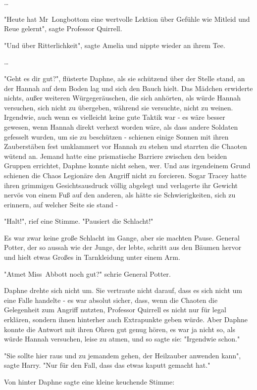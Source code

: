 {…

"Heute hat Mr~Longbottom eine wertvolle Lektion über Gefühle wie Mitleid und Reue gelernt", sagte Professor Quirrell.

"Und über Ritterlichkeit", sagte Amelia und nippte wieder an ihrem Tee.

…

"Geht es dir gut?", flüsterte Daphne, als sie schützend über der Stelle stand, an der Hannah auf dem Boden lag und sich den Bauch hielt. Das Mädchen erwiderte nichts, außer weiteren Würgegeräuschen, die sich anhörten, als würde Hannah versuchen, sich nicht zu übergeben, während sie versuchte, nicht zu weinen. Irgendwie, auch wenn es vielleicht keine gute Taktik war - es wäre besser gewesen, wenn Hannah direkt verhext worden wäre, als dass andere Soldaten gefesselt wurden, um sie zu beschützen - schienen einige Sonnen mit ihren Zauberstäben fest umklammert vor Hannah zu stehen und starrten die Chaoten wütend an. Jemand hatte eine prismatische Barriere zwischen den beiden Gruppen errichtet, Daphne konnte nicht sehen, wer. Und aus irgendeinem Grund schienen die Chaos Legionäre den Angriff nicht zu forcieren. Sogar Tracey hatte ihren grimmigen Gesichtsausdruck völlig abgelegt und verlagerte ihr Gewicht nervös von einem Fuß auf den anderen, als hätte sie Schwierigkeiten, sich zu erinnern, auf welcher Seite sie stand -

"Halt!", rief eine Stimme. "Pausiert die Schlacht!"

Es war zwar keine große Schlacht im Gange, aber sie machten Pause. General Potter, der so aussah wie der Junge, der lebte, schritt aus den Bäumen hervor und hielt etwas Großes in Tarnkleidung unter einem Arm.

"Atmet Miss~Abbott noch gut?" schrie General Potter.

Daphne drehte sich nicht um. Sie vertraute nicht darauf, dass es sich nicht um eine Falle handelte - es war absolut sicher, dass, wenn die Chaoten die Gelegenheit zum Angriff nutzten, Professor Quirrell es nicht nur für legal erklären, sondern ihnen hinterher auch Extrapunkte geben würde. Aber Daphne konnte die Antwort mit ihren Ohren gut genug hören, es war ja nicht so, als würde Hannah versuchen, leise zu atmen, und so sagte sie: "Irgendwie schon."

"Sie sollte hier raus und zu jemandem gehen, der Heilzauber anwenden kann", sagte Harry. "Nur für den Fall, dass das etwas kaputt gemacht hat."

Von hinter Daphne sagte eine kleine keuchende Stimme:

}
